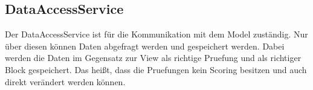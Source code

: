 \subsection{DataAccessService}
Der DataAccessService ist für die Kommunikation mit dem Model zuständig.
Nur über diesen können Daten abgefragt werden und gespeichert werden.
Dabei werden die Daten im Gegensatz zur View als richtige Pruefung und als richtiger Block gespeichert.
Das heißt, dass die Pruefungen kein Scoring besitzen und auch direkt verändert werden können.

